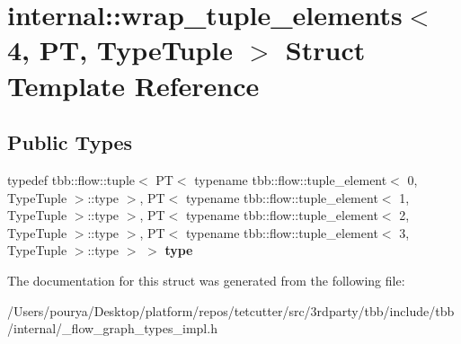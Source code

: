 \hypertarget{structinternal_1_1wrap__tuple__elements_3_014_00_01PT_00_01TypeTuple_01_4}{}\section{internal\+:\+:wrap\+\_\+tuple\+\_\+elements$<$ 4, P\+T, Type\+Tuple $>$ Struct Template Reference}
\label{structinternal_1_1wrap__tuple__elements_3_014_00_01PT_00_01TypeTuple_01_4}
\subsection*{Public Types}
\begin{DoxyCompactItemize}
\item 
\hypertarget{structinternal_1_1wrap__tuple__elements_3_014_00_01PT_00_01TypeTuple_01_4_a0906f54403e3508baea327170172b13d}{}typedef tbb\+::flow\+::tuple$<$ P\+T$<$ typename tbb\+::flow\+::tuple\+\_\+element$<$ 0, Type\+Tuple $>$\+::type $>$, P\+T$<$ typename tbb\+::flow\+::tuple\+\_\+element$<$ 1, Type\+Tuple $>$\+::type $>$, P\+T$<$ typename tbb\+::flow\+::tuple\+\_\+element$<$ 2, Type\+Tuple $>$\+::type $>$, P\+T$<$ typename tbb\+::flow\+::tuple\+\_\+element$<$ 3, Type\+Tuple $>$\+::type $>$ $>$ {\bfseries type}\label{structinternal_1_1wrap__tuple__elements_3_014_00_01PT_00_01TypeTuple_01_4_a0906f54403e3508baea327170172b13d}

\end{DoxyCompactItemize}


The documentation for this struct was generated from the following file\+:\begin{DoxyCompactItemize}
\item 
/\+Users/pourya/\+Desktop/platform/repos/tetcutter/src/3rdparty/tbb/include/tbb/internal/\+\_\+flow\+\_\+graph\+\_\+types\+\_\+impl.\+h\end{DoxyCompactItemize}
